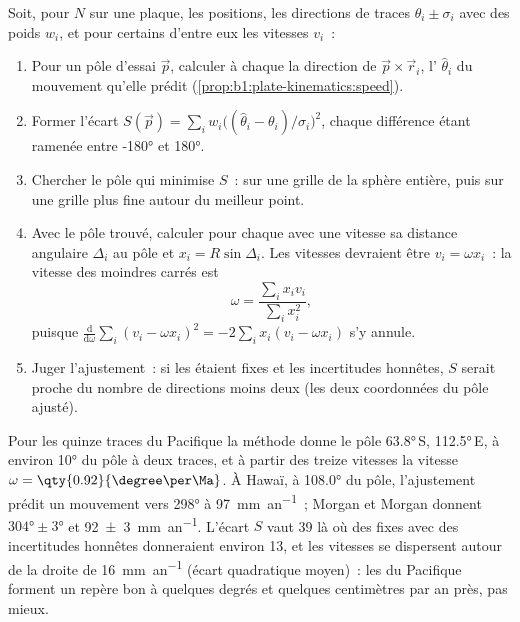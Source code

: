 \begin{method}\label{met:b1:hotspots:pole-fit}
Soit, pour $N$  sur une plaque, les positions, les directions de traces
$\theta_i \pm \sigma_i$ avec des poids $w_i$, et pour certains d'entre eux les vitesses
$v_i$~:
\begin{enumerate}
  \item Pour un pôle d'essai $\vec p$, calculer à chaque  la direction de
        $\vec p\times\vec r_i$, l' $\hat\theta_i$ du mouvement qu'elle
        prédit (\cref{prop:b1:plate-kinematics:speed}).
  \item Former l'écart $S(\vec p) = \sum_i w_i\bigl((\hat\theta_i -
        \theta_i)/\sigma_i\bigr)^2$, chaque différence étant ramenée entre
        \ang{-180} et \ang{180}.
  \item Chercher le pôle qui minimise $S$~: sur une grille de la sphère entière,
        puis sur une grille plus fine autour du meilleur point.
  \item Avec le pôle trouvé, calculer pour chaque  avec une vitesse sa distance
        angulaire $\Delta_i$ au pôle et $x_i = R\sin\Delta_i$. Les vitesses
        devraient être $v_i = \omega x_i$~: la vitesse des moindres carrés est
        \[
          \omega = \frac{\sum_i x_i v_i}{\sum_i x_i^2},
        \]
        puisque $\frac{\mathrm d}{\mathrm d\omega}\sum_i (v_i - \omega x_i)^2 =
        -2\sum_i x_i(v_i - \omega x_i)$ s'y annule.
  \item Juger l'ajustement~: si les  étaient fixes et les incertitudes
        honnêtes, $S$ serait proche du nombre de directions moins deux (les
        deux coordonnées du pôle ajusté).
\end{enumerate}
\end{method}

Pour les quinze traces du Pacifique la méthode donne le pôle \ang{63.8}\,S,
\ang{112.5}\,E, à environ \ang{10} du pôle à deux traces, et à partir des treize
vitesses la vitesse $\omega = \qty{0.92}{\degree\per\Ma}$. À Hawaï, à \ang{108.0}
du pôle, l'ajustement prédit un mouvement vers \ang{298} à
\qty{97}{mm.an^{-1}}~; Morgan et Morgan donnent $\ang{304}\pm\ang{3}$ et
\qty[uncertainty-mode=separate]{92 \pm 3}{mm.an^{-1}}. L'écart $S$ vaut 39
là où des  fixes avec des incertitudes honnêtes donneraient environ 13, et les
vitesses se dispersent autour de la droite de \qty{16}{mm.an^{-1}} (écart quadratique moyen)~: les
 du Pacifique forment un repère bon à quelques degrés et quelques
centimètres par an près, pas mieux.

